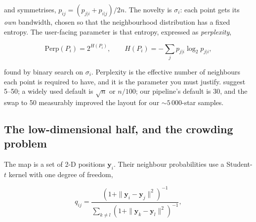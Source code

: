 and symmetrises, $p_{ij} = (p_{j|i} + p_{i|j})/2n$. The novelty is $\sigma_i$:
each point gets its \emph{own} bandwidth, chosen so that the neighbourhood
distribution has a fixed entropy. The user-facing parameter is that entropy,
expressed as \emph{perplexity},

\begin{equation}
\mathrm{Perp}(P_i) = 2^{H(P_i)}, \qquad
H(P_i) = -\sum_j p_{j|i} \log_2 p_{j|i},
\label{eq:perplexity}
\end{equation}

found by binary search on $\sigma_i$. Perplexity is the effective number of
neighbours each point is required to have, and it is the parameter you must
justify. \citet{vanderMaaten:08} suggest 5--50; a widely used default is
$\sqrt{n}$ or $n/100$; our pipeline's default is 30, and the swap to 50
measurably improved the layout for our $\sim\!5\,000$-star samples.

\begin{marginnote}[]
\end{marginnote}

\subsection{The low-dimensional half, and the crowding problem}

The map is a set of 2-D positions $\mathbf{y}_i$. Their neighbour
probabilities use a Student-$t$ kernel with one degree of freedom,

\begin{equation}
q_{ij} = \frac{\left(1 + \|\mathbf{y}_i - \mathbf{y}_j\|^2\right)^{-1}}
{\sum_{k \neq l} \left(1 + \|\mathbf{y}_k - \mathbf{y}_l\|^2\right)^{-1}} ,
\label{eq:qlow}
\end{equation}

